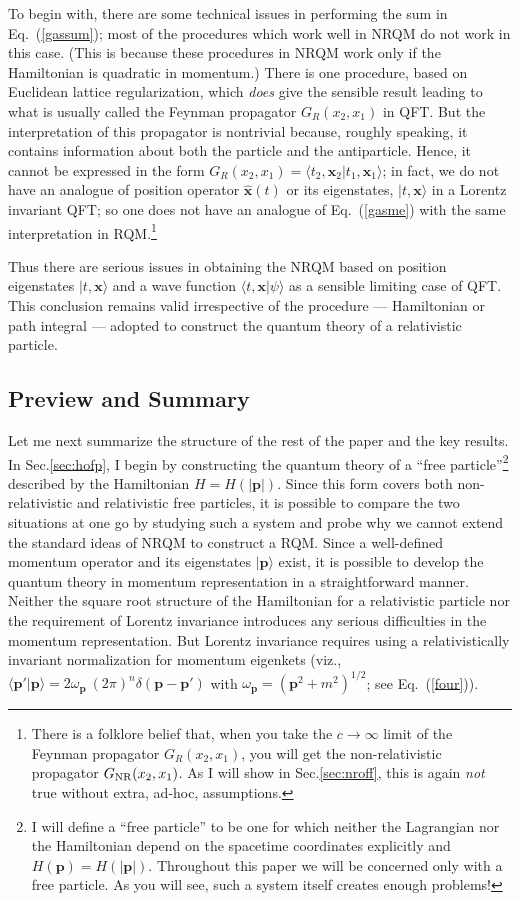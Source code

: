 \documentclass{article}
\def\eq#1{{Eq.~(\ref{#1})}}
\def\ket#1{|#1\rangle}                    %
\def\amp#1#2{\langle #1 | #2\rangle}      %
\begin{document}
To begin with, there are some technical issues in performing the sum in \eq{gassum}; most of the procedures which work well in NRQM do not work in this case.
(This is because  these procedures in NRQM work only if the Hamiltonian is quadratic in momentum.)
There is one procedure, based on Euclidean lattice regularization, which \textit{does} give the sensible result leading to what is usually called the Feynman propagator $G_R(x_2,x_1)$ in QFT. But the interpretation of this propagator is  nontrivial because, roughly speaking, it contains information about both the particle and the antiparticle. Hence, it cannot be expressed in the form
$G_R(x_2,x_1)=\amp{t_2,\bm{x}_2}{t_1,\bm{x}_1}$; in fact,
we do not have an analogue of position operator $\hat{\bm{x}}(t)$ or its eigenstates, $\ket{t,\bm{x}}$ in a Lorentz invariant QFT;
so one does not have an analogue of \eq{gasme} with the same interpretation in RQM.\footnote{There is a folklore belief that, when you take the $c\to \infty $ limit of the Feynman propagator $G_R(x_2,x_1)$, you will get the non-relativistic propagator $G_{\rm NR}(x_2, x_1)$. As I will show in Sec.\ref{sec:nroff}, this is again \textit{not} true without extra, ad-hoc, assumptions.} 
 
 Thus there are serious issues in obtaining the NRQM based on position eigenstates $\ket{t,\bm{x}}$ and a wave function $\amp{t,\bm{x}}{\psi}$
 as a sensible limiting case of QFT. This conclusion remains valid irrespective of the procedure --- Hamiltonian or path integral --- adopted to construct the quantum theory of a relativistic particle. 
 
 \subsection{Preview and Summary}\label{sec:presum}
 
  Let me next summarize the structure of the rest of the paper and the key results. In Sec.\ref{sec:hofp}, I begin by constructing the quantum theory of a ``free particle''\footnote{I will define a ``free particle'' to be one for which neither the Lagrangian nor the Hamiltonian depend on the spacetime coordinates explicitly and $H(\bm{p}) = H(|\bm{p}|)$. Throughout this paper we will be concerned only with a free particle. As you will see, such a system itself creates enough problems!} described by the Hamiltonian $ H= H(|\bm{p}|)$. Since this form covers both non-relativistic and relativistic free particles, it is possible to compare the two situations at one go by studying such a system and probe why we cannot extend the standard ideas of NRQM to construct a RQM.   Since a well-defined momentum operator and its eigenstates $\ket{\bm{p}}$ exist, it is possible to develop the quantum theory in momentum representation in a straightforward manner. Neither the square root structure of the Hamiltonian for a relativistic particle nor the requirement of Lorentz invariance introduces any serious difficulties in the momentum representation. But Lorentz invariance  requires using a relativistically invariant normalization for momentum eigenkets (viz., $\amp{\bm{p}'}{\bm{p}} = 2\omega_{\bm{p}}\ (2\pi)^n \delta (\bm{p}- \bm{p}')$ with $\omega_{\bm{p}}=(\bm{p}^2+m^2)^{1/2}$; see \eq{four}).
  
\end{document}

